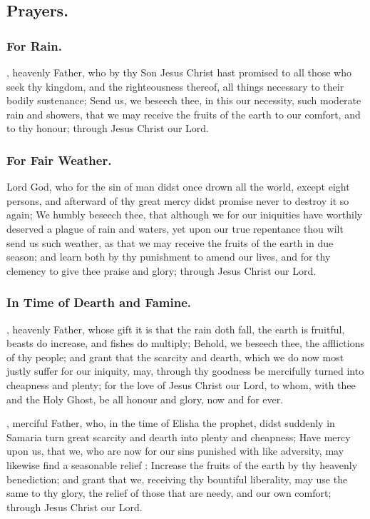 
\subsection{Prayers.}

\subsubsection{For Rain.}
, heavenly Father, who by thy Son Jesus Christ hast promised to all those who seek thy kingdom, and the righteousness thereof, all things necessary to their bodily sustenance; Send us, we beseech thee, in this our necessity, such moderate rain and showers, that we may receive the fruits of the earth to our comfort, and to thy honour; through Jesus Christ our Lord.

\subsubsection{For Fair Weather.}
 Lord God, who for the sin of man didst once drown all the world, except eight persons, and afterward of thy great mercy didst promise never to destroy it so again; We humbly beseech thee, that although we for our iniquities have worthily deserved a plague of rain and waters, yet upon our true repentance thou wilt send us such weather, as that we may receive the fruits of the earth in due season; and learn both by thy punishment to amend our lives, and for thy clemency to give thee praise and glory; through Jesus Christ our Lord.

\subsubsection{In Time of Dearth and Famine.}
, heavenly Father, whose gift it is that the rain doth fall, the earth is fruitful, beasts do increase, and fishes do multiply; Behold, we beseech thee, the afflictions of thy people; and grant that the scarcity and dearth, which we do now most justly suffer for our iniquity, may, through thy goodness be mercifully turned into cheapness and plenty; for the love of Jesus Christ our Lord, to whom, with thee and the Holy Ghost, be all honour and glory, now and for ever.

, merciful Father, who, in the time of Elisha the prophet, didst suddenly in Samaria turn great scarcity and dearth into plenty and cheapness; Have mercy upon us, that we, who are now for our sins punished with like adversity, may likewise find a seasonable relief : Increase the fruits of the earth by thy heavenly benediction; and grant that we, receiving thy bountiful liberality, may use the same to thy glory, the relief of those that are needy, and our own comfort; through Jesus Christ our Lord.

